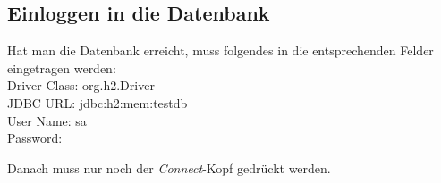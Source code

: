 \documentclass[a4paper]{report}
\newenvironment{code}{\ttfamily}{\par}
\begin{document}
\subsection{Einloggen in die Datenbank}
Hat man die Datenbank erreicht, muss folgendes in die entsprechenden Felder eingetragen werden:\\

\begin{code}
	Driver Class: org.h2.Driver\\
	JDBC URL: jdbc:h2:mem:testdb\\
	User Name: sa\\
	Password: \\
\end{code}
\noindent
Danach muss nur noch der \textit{Connect}-Kopf gedrückt werden.
\end{document}
